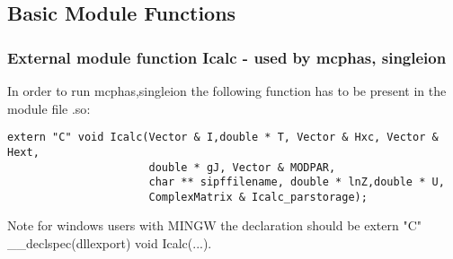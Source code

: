 \subsection{Basic Module Functions}


\subsubsection{External module function {\prg Icalc} - used by {\prg mcphas},
{\prg singleion} }

In order to run {\prg mcphas},{\prg singleion}
 the following function has to be present in the module file {\prg *.so}:

\begin{verbatim}
extern "C" void Icalc(Vector & I,double * T, Vector & Hxc, Vector & Hext,
                      double * gJ, Vector & MODPAR,
                      char ** sipffilename, double * lnZ,double * U,
                      ComplexMatrix & Icalc_parstorage);
\end{verbatim}

Note for windows users with MINGW the declaration should be {\prg extern "C" \_\_declspec(dllexport) void %
Icalc(...)}.

